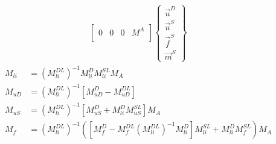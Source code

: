 \documentclass[10pt,letterpaper,oneside,notitlepage]{article}
\begin{document}
\begin{itemize}
\begin{multline}
\begin{bmatrix}
            0                    & 0   & 0   & M^A \\
            \end{bmatrix}
            \left\{   \begin{matrix} \vec{u}^D \\ \vec{u}^{S}  \\ \vec{f}^{S}  \\ \vec{m}^{S} \end{matrix} \right\}             
         \end{multline}            
      \begin{align}
       M_{li} &= \left(M_{li}^{DL}\right)^{-1}M_{li}^D M_{li}^{SL} M_A \\ 
        M_{uD} &= \left(M_{li}^{DL}\right)^{-1}\left[M_{uD}^D - M_{uD}^{DL}\right] \\
        M_{uS} &= \left(M_{li}^{DL}\right)^{-1} \left[ M_{uS}^D + M_{li}^D M_{uS}^{SL}\right] M_A \\
        M_{f}  &= \left(M_{li}^{DL}\right)^{-1}\left( \left[M_{f}^D - M_{f}^{DL}\left(M_{li}^{DL}\right)^{-1}M_{li}^D\right] M_{li}^{SL} +
                         M_{li}^D M_{f}^{SL}  \right)M_A \end{align} 
   

\end{itemize}
\end{document}
